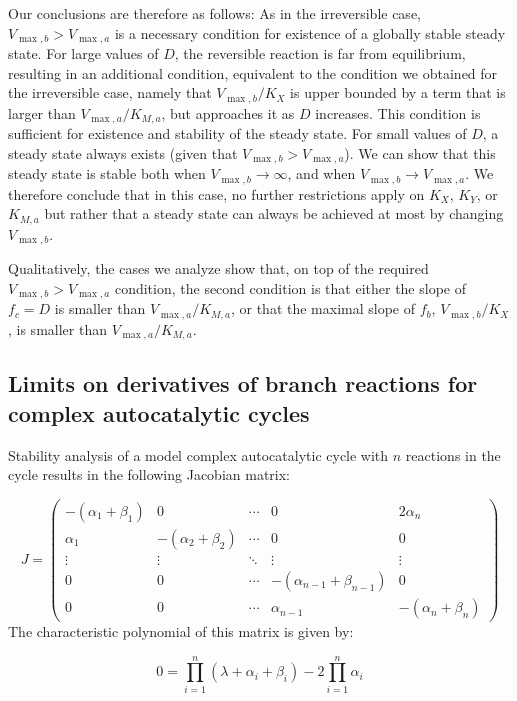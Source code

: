 Our conclusions are therefore as follows:
As in the irreversible case, $V_{\max,b}>V_{\max,a}$ is a necessary condition for existence of a globally stable steady state.
For large values of $D$, the reversible reaction is far from equilibrium, resulting in an additional condition, equivalent to the condition we obtained for the irreversible case, namely that $V_{\max,b}/K_X$ is upper bounded by a term that is larger than $V_{\max,a}/K_{M,a}$, but approaches it as $D$ increases.
This condition is sufficient for existence and stability of the steady state.
For small values of $D$, a steady state always exists (given that $V_{\max,b}>V_{\max,a}$).
We can show that this steady state is stable both when $V_{\max,b}\rightarrow \infty$, and when $V_{\max,b}\rightarrow V_{\max,a}$.
We therefore conclude that in this case, no further restrictions apply on $K_X$, $K_Y$, or $K_{M,a}$ but rather that a steady state can always be achieved at most by changing $V_{\max,b}$.

Qualitatively, the cases we analyze show that, on top of the required $V_{\max,b}>V_{\max,a}$ condition, the second condition is that either the slope of $f_c=D$ is smaller than $V_{\max,a}/K_{M,a}$, or that the maximal slope of $f_b$, $V_{\max,b}/K_X$, is smaller than $V_{\max,a}/K_{M,a}$.
  \subsection{Limits on derivatives of branch reactions for complex autocatalytic cycles}
  Stability analysis of a model complex autocatalytic cycle with $n$ reactions in the cycle results in the following Jacobian matrix:

  \begin{equation}
    \label{eq:jacobian}
    J=
    \begin{pmatrix}
        -(\alpha_1+\beta_1) & 0 & \cdots & 0 & 2\alpha_n \\
        \alpha_1 & -(\alpha_2+\beta_2) & \cdots & 0 & 0 \\
        \vdots & \vdots & \ddots & \vdots & \vdots \\
        0 & 0 & \cdots & -(\alpha_{n-1}+\beta_{n-1}) & 0\\
        0 & 0 & \cdots & \alpha_{n-1} & -(\alpha_n+\beta_n)
     \end{pmatrix}
  \end{equation}
   The characteristic polynomial of this matrix is given by:

    \begin{equation}
        \label{eq:complex}
        0=\prod_{i=1}^n(\lambda+\alpha_i+\beta_i)-2\prod_{i=1}^n\alpha_i
    \end{equation}

